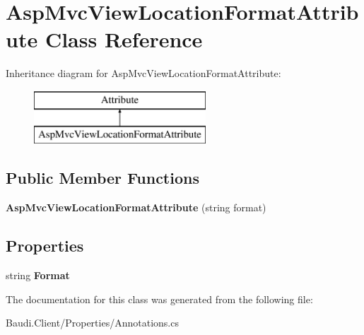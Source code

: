 \hypertarget{class_asp_mvc_view_location_format_attribute}{}\section{Asp\+Mvc\+View\+Location\+Format\+Attribute Class Reference}
\label{class_asp_mvc_view_location_format_attribute}
Inheritance diagram for Asp\+Mvc\+View\+Location\+Format\+Attribute\+:\begin{figure}[H]
\begin{center}
\leavevmode
\includegraphics[height=2.000000cm]{class_asp_mvc_view_location_format_attribute}
\end{center}
\end{figure}
\subsection*{Public Member Functions}
\begin{DoxyCompactItemize}
\item 
\hypertarget{class_asp_mvc_view_location_format_attribute_aecb3c29d8605da500d4af960ba99f207}{}{\bfseries Asp\+Mvc\+View\+Location\+Format\+Attribute} (string format)\label{class_asp_mvc_view_location_format_attribute_aecb3c29d8605da500d4af960ba99f207}

\end{DoxyCompactItemize}
\subsection*{Properties}
\begin{DoxyCompactItemize}
\item 
\hypertarget{class_asp_mvc_view_location_format_attribute_a3489b3971df02310fd8abb286247c4ae}{}string {\bfseries Format}\label{class_asp_mvc_view_location_format_attribute_a3489b3971df02310fd8abb286247c4ae}

\end{DoxyCompactItemize}


The documentation for this class was generated from the following file\+:\begin{DoxyCompactItemize}
\item 
Baudi.\+Client/\+Properties/Annotations.\+cs\end{DoxyCompactItemize}
